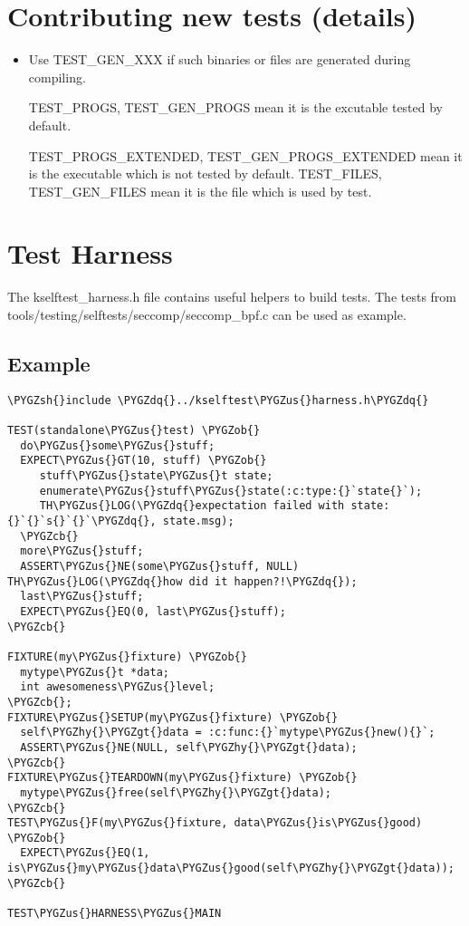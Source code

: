 \documentclass[a4paper,8pt,english]{sphinxmanual}
\def\PYGZus{\char`\_}
\def\PYGZob{\char`\{}
\def\PYGZcb{\char`\}}
\def\PYGZgt{\char`\>}
\def\PYGZsh{\char`\#}
\def\PYGZhy{\char`\-}
\def\PYGZdq{\char`\"}
\begin{document}
\section{Contributing new tests (details)}
\label{dev-tools/kselftest:contributing-new-tests-details}\begin{itemize}
\item {} 
Use TEST\_GEN\_XXX if such binaries or files are generated during
compiling.

TEST\_PROGS, TEST\_GEN\_PROGS mean it is the excutable tested by
default.

TEST\_PROGS\_EXTENDED, TEST\_GEN\_PROGS\_EXTENDED mean it is the
executable which is not tested by default.
TEST\_FILES, TEST\_GEN\_FILES mean it is the file which is used by
test.

\end{itemize}


\section{Test Harness}
\label{dev-tools/kselftest:test-harness}
The kselftest\_harness.h file contains useful helpers to build tests.  The tests
from tools/testing/selftests/seccomp/seccomp\_bpf.c can be used as example.


\subsection{Example}
\label{dev-tools/kselftest:example}
\begin{Verbatim}[commandchars=\\\{\}]
\PYGZsh{}include \PYGZdq{}../kselftest\PYGZus{}harness.h\PYGZdq{}

TEST(standalone\PYGZus{}test) \PYGZob{}
  do\PYGZus{}some\PYGZus{}stuff;
  EXPECT\PYGZus{}GT(10, stuff) \PYGZob{}
     stuff\PYGZus{}state\PYGZus{}t state;
     enumerate\PYGZus{}stuff\PYGZus{}state(:c:type:{}`state{}`);
     TH\PYGZus{}LOG(\PYGZdq{}expectation failed with state: {}`{}`s{}`{}`\PYGZdq{}, state.msg);
  \PYGZcb{}
  more\PYGZus{}stuff;
  ASSERT\PYGZus{}NE(some\PYGZus{}stuff, NULL) TH\PYGZus{}LOG(\PYGZdq{}how did it happen?!\PYGZdq{});
  last\PYGZus{}stuff;
  EXPECT\PYGZus{}EQ(0, last\PYGZus{}stuff);
\PYGZcb{}

FIXTURE(my\PYGZus{}fixture) \PYGZob{}
  mytype\PYGZus{}t *data;
  int awesomeness\PYGZus{}level;
\PYGZcb{};
FIXTURE\PYGZus{}SETUP(my\PYGZus{}fixture) \PYGZob{}
  self\PYGZhy{}\PYGZgt{}data = :c:func:{}`mytype\PYGZus{}new(){}`;
  ASSERT\PYGZus{}NE(NULL, self\PYGZhy{}\PYGZgt{}data);
\PYGZcb{}
FIXTURE\PYGZus{}TEARDOWN(my\PYGZus{}fixture) \PYGZob{}
  mytype\PYGZus{}free(self\PYGZhy{}\PYGZgt{}data);
\PYGZcb{}
TEST\PYGZus{}F(my\PYGZus{}fixture, data\PYGZus{}is\PYGZus{}good) \PYGZob{}
  EXPECT\PYGZus{}EQ(1, is\PYGZus{}my\PYGZus{}data\PYGZus{}good(self\PYGZhy{}\PYGZgt{}data));
\PYGZcb{}

TEST\PYGZus{}HARNESS\PYGZus{}MAIN
\end{Verbatim}
\end{document}
